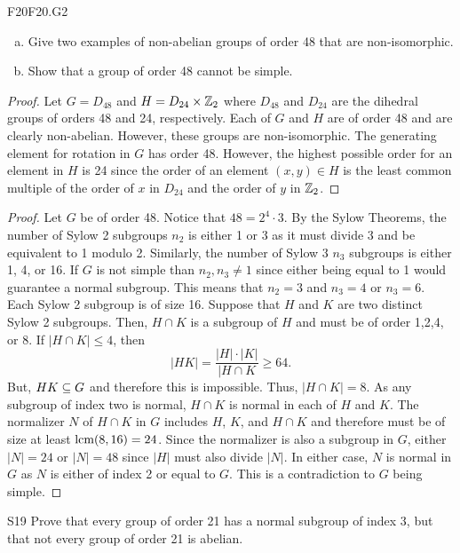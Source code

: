 \documentclass[../AlgebraQualSolutions.tex]{subfiles}
\begin{document}
	
	\begin{prob}{F20}{F20.G2}
	\begin{enumerate}[(a)]
	\item Give two examples of non-abelian groups of order 48 that are non-isomorphic.
	\item Show that a group of order 48 cannot be simple.
	\end{enumerate}
	\end{prob}
	
	\begin{proof}
	Let $G = D_{48}$ and $H = D_{24} \times \mathbb{Z}_2$ where $D_{48}$ and $D_{24}$ are the dihedral groups of orders 48 and 24, respectively. Each of $G$ and $H$ are of order 48 and are clearly non-abelian. However, these groups are non-isomorphic. The generating element for rotation in $G$ has order 48. However, the highest possible order for an element in $H$ is 24 since the order of an element $(x,y) \in H$ is the least common multiple of the order of $x$ in $D_{24}$ and the order of $y$ in $\mathbb{Z}_2$.
	\end{proof}
	
	\begin{proof}
	Let $G$ be of order 48. Notice that $48 = 2^4 \cdot 3$. By the Sylow Theorems, the number of Sylow 2 subgroups $n_2$ is either 1 or 3 as it must divide 3 and be equivalent to 1 modulo 2. Similarly, the number of Sylow 3 $n_3$ subgroups is either 1, 4, or 16. If $G$ is not simple than $n_2, n_3 \neq 1$ since either being equal to 1 would guarantee a normal subgroup. This means that $n_2 = 3$ and $n_3 = 4$ or $n_3 = 6$. Each Sylow 2 subgroup is of size 16. Suppose that $H$ and $K$ are two distinct Sylow 2 subgroups. Then, $H \cap K$ is a subgroup of $H$ and must be of order 1,2,4, or 8. If $|H \cap K| \leq 4$, then
	\[ |HK| = \frac{|H|\cdot|K|}{|H\cap K} \geq 64. \]
But, $HK \subseteq G$ and therefore this is impossible. Thus, $|H \cap K| = 8$. As any subgroup of index two is normal, $H \cap K$ is normal in each of $H$ and $K$. The normalizer $N$ of $H\cap K$ in $G$ includes $H$, $K$, and $H \cap K$ and therefore must be of size at least $\textrm{lcm}(8,16) = 24$. Since the normalizer is also a subgroup in $G$, either $|N| = 24$ or $|N| = 48$ since $|H|$ must also divide $|N|$. In either case, $N$ is normal in $G$ as $N$ is either of index 2 or equal to $G$. This is a contradiction to $G$ being simple.
	\end{proof}
	
	
	\begin{prob}{S19}{}
	Prove that every group of order 21 has a normal subgroup of index 3, but that not every group of order 21 is abelian.
	\end{prob}
	
\end{document}
